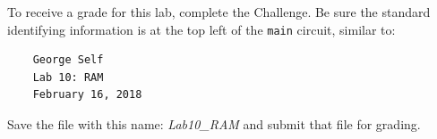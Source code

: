 To receive a grade for this lab, complete the Challenge. Be sure the standard identifying information is at the top left of the \lstinline{main} circuit, similar to: 

\bigskip
\begin{minipage}{\linewidth}
	\begin{verbatim}
	George Self
	Lab 10: RAM
	February 16, 2018
	\end{verbatim}
\end{minipage}
\bigskip

Save the file with this name: \textit{Lab10\_RAM} and submit that file for grading.
